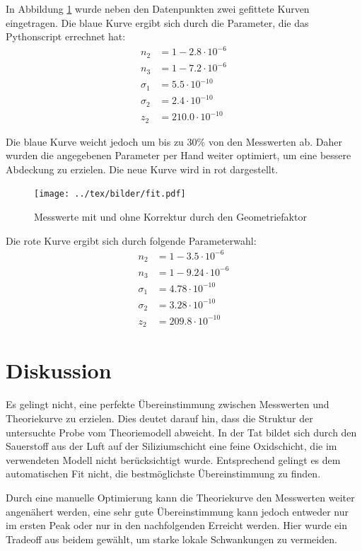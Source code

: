 In Abbildung \ref{pic:fit} wurde neben den Datenpunkten zwei gefittete Kurven eingetragen. Die blaue Kurve ergibt sich durch die Parameter, die das Pythonscript errechnet hat:
\begin{align*}
	n_2 &= 1-2.8\cdot 10^{-6}\\
	n_3 &= 1-7.2\cdot 10^{-6}\\
	\sigma_1 &= 5.5\cdot 10^{-10} \\
	\sigma_2 &= 2.4\cdot 10^{-10}\\
	z_2&= 210.0\cdot 10^{-10}
\end{align*}

Die blaue Kurve weicht jedoch um bis zu 30\% von den Messwerten ab. Daher wurden die angegebenen Parameter per Hand weiter optimiert, um eine bessere Abdeckung zu erzielen. Die neue Kurve wird in rot dargestellt.
\begin{figure}[h]
	\centering
	\texttt{[image: ../tex/bilder/fit.pdf]}
	\caption{Messwerte mit und ohne Korrektur durch den Geometriefaktor}
	\label{pic:fit}
\end{figure}


Die rote Kurve ergibt sich durch folgende Parameterwahl:
\begin{align*}
n_2 &= 1-3.5\cdot 10^{-6}\\
n_3 &= 1-9.24\cdot 10^{-6}\\
\sigma_1 &= 4.78\cdot 10^{-10} \\
\sigma_2 &= 3.28\cdot 10^{-10}\\
 z_2&= 209.8\cdot 10^{-10}
\end{align*}

\section{Diskussion}
Es gelingt nicht, eine perfekte Übereinstimmung zwischen Messwerten und Theoriekurve zu erzielen.
Dies deutet darauf hin, dass die Struktur der untersuchte Probe vom Theoriemodell abweicht. In der Tat bildet sich durch den Sauerstoff aus der Luft auf der Siliziumschicht eine feine Oxidschicht, die im verwendeten Modell nicht berücksichtigt wurde.
Entsprechend gelingt es dem automatischen Fit nicht, die bestmöglichste Übereinstimmung zu finden.

Durch eine manuelle Optimierung kann die Theoriekurve den Messwerten weiter angenähert werden, eine sehr gute Übereinstimmung kann jedoch entweder nur im ersten Peak oder nur in den nachfolgenden Erreicht werden. Hier wurde ein Tradeoff aus beidem gewählt, um starke lokale Schwankungen zu vermeiden.

